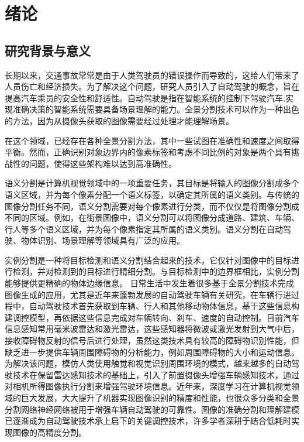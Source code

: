 \chapter{绪论}
\section{研究背景与意义}
长期以来，交通事故常常是由于人类驾驶员的错误操作而导致的，这给人们带来了人员伤亡和经济损失。为了解决这个问题，研究人员引入了自动驾驶的概念，旨在提高汽车乘员的安全性和舒适性\cite{秦飞巍2021无人驾驶中的场景实时语义分割方法}。自动驾驶是指在智能系统的控制下驾驶汽车,实现准确决策的智能系统需要具备场景理解的能力。全景分割技术可以作为一种出色的方法，因为从摄像头获取的图像需要经过处理才能理解场景\cite{everingham2010pascal}。

在这个领域，已经存在各种全景分割方法，其中一些试图在准确性和速度之间取得平衡。然而，正确识别对象边界内的像素标签和考虑不同比例的对象是两个具有挑战性的问题，使得这些架构难以达到高准确性。

语义分割是计算机视觉领域中的一项重要任务，其目标是将输入的图像分割成多个语义区域，并为每个像素分配一个语义标签，以确定其所属的语义类别。与传统的图像分割任务不同，语义分割需要对每个像素进行分类，而不仅仅是将图像分割成不同的区域。例如，在街景图像中，语义分割可以将图像分成道路、建筑、车辆、行人等多个语义区域，并为每个像素指定其所属的语义类别。语义分割在自动驾驶、物体识别、场景理解等领域具有广泛的应用。

实例分割是一种将目标检测和语义分割结合起来的技术，它仅针对图像中的目标进行检测，并对检测到的目标进行精细分割。与目标检测中的边界框相比，实例分割能够提供更精确的物体边缘信息\cite{kirillov2019panoptic}。
日常生活中发生着很多基于全景分割技术完成图像生成的应用，尤其是近年来蓬勃发展的自动驾驶车辆有关研究，在车辆行进过程中，自动驾驶技术首先获取到车辆、行人和其他移动物体信息，基于这些信息构建调控模型，再依据这些信息完成对车辆转向、刹车、速度的自动控制。目前汽车信息感知常用毫米波雷达和激光雷达，这些感知器将微波或激光发射到大气中后，接收障碍物反射的信号后进行处理，虽然这类技术具有较高的障碍物识别性能，但缺乏进一步提供车辆周围障碍物的分析能力，例如周围障碍物的大小和运动信息。为解决该问题，模仿人类使用触觉和视觉识别周围环境的模式，越来越多的自动驾驶技术在保留雷达感知技术的基础上，引入了前置摄像头增强车辆感知技术，通过对相机所得图像执行分割来增强驾驶环境信息。近年来，深度学习在计算机视觉领域的巨大发展，大大提升了机器实现图像识别的精度和性能，也很众多分类和全景分割网络神经网络\cite{wangye}被用于增强车辆自动驾驶的可靠性。图像的准确分割和理解建模已逐渐成为自动驾驶技术承上启下的关键调控技术，许多学者深耕于结合低耗时实现图像的高精度分割。

